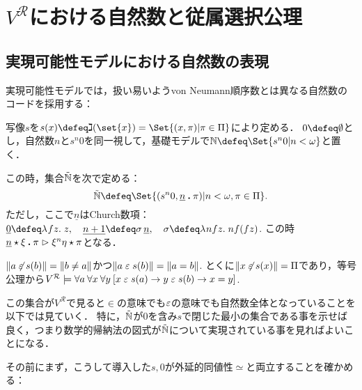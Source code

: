 \documentclass[realisability.tex]{subfiles}
\begin{document}
\section{$V^{\mathcal{R}}$における自然数と従属選択公理}
\subsection{実現可能性モデルにおける自然数の表現}
実現可能性モデルでは，扱い易いようvon Neumann順序数とは異なる自然数のコードを採用する：

\begin{definition}
 写像$s$を$s(x) \defeq \gimel(\set{x}) = \Set{ (x, \pi) | \pi \in \Pi}$により定める．
 $0 \defeq \emptyset$とし，自然数$n$と$s^n 0$を同一視して，基礎モデルで$\mathbb{N} \defeq \Set{ s^n 0 | n < \omega}$と置く．

 この時，集合$\mathord{\tilde{\mathbb{N}}}$を次で定める：
 \[
  \NN \defeq \Set{ (s^n 0, \num{n} \push \pi) | n < \omega, \pi \in \Pi}.
 \]
 ただし，ここで$\underline{n}$はChurch数項：$\underline{0} \defeq \abs{f z}{z}, \quad \underline{n+1} \defeq \sigma \, \underline{n}, \quad \sigma \defeq \abs{n f z}{n f (f z)}$.
 この時$\underline{n} \mathbin{\star} \xi \mathbin{\boldsymbol{.}} \pi \mathrel{\rhd} \xi^n \eta \mathbin{\star} \pi$となる．
\end{definition}
\begin{remark}
 $\|a \not\mathrel{\varepsilon} s(b)\| = \|b \neq a\|$かつ$\|a \mathrel{\varepsilon} s(b)\| = \|a = b\|$.
 とくに$\|x \not\mathrel{\varepsilon} s(x)\| = \Pi$であり，等号公理から$V^{\mathcal{R}} \models \forall a \: \forall x \: \forall y \: [x \mathrel{\varepsilon} s(a) \to y \mathrel{\varepsilon} s(b) \to x = y]$.
\end{remark}

この集合が$V^{\mathcal{R}}$で見ると$\in$の意味でも$\mathrel{\varepsilon}$の意味でも自然数全体となっていることを以下では見ていく．
特に，$\mathord{\tilde{\mathbb{N}}}$が$0$を含み$s$で閉じた最小の集合である事を示せば良く，つまり数学的帰納法の図式が$\mathord{\tilde{\mathbb{N}}}$について実現されている事を見ればよいことになる．

その前にまず，こうして導入した$s, 0$が外延的同値性$\simeq$と両立することを確かめる：
\end{document}
